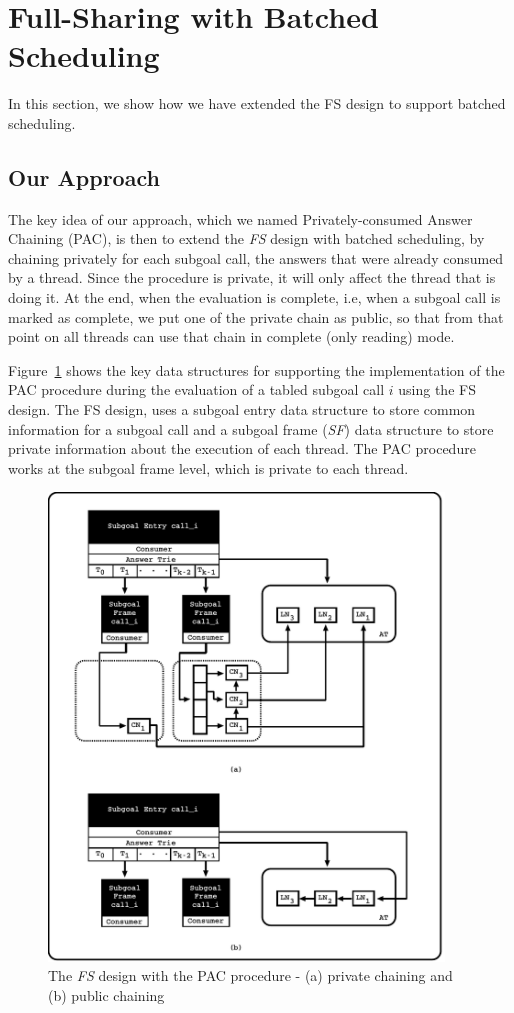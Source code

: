 \documentclass{llncs}
\begin{document}
\section{Full-Sharing with Batched Scheduling}

In this section, we show how we have extended the FS design to support
batched scheduling.

\subsection{Our Approach}

The key idea of our approach, which we named Privately-consumed Answer
Chaining (PAC), is then to extend the \emph{FS} design with batched
scheduling, by chaining privately for each subgoal call, the answers
that were already consumed by a thread. Since the procedure is
private, it will only affect the thread that is doing it. At the end,
when the evaluation is complete, i.e, when a subgoal call is marked as
complete, we put one of the private chain as public, so that from that
point on all threads can use that chain in complete (only reading)
mode.

Figure~\ref{fig_tabtries_pcc} shows the key data structures for
supporting the implementation of the PAC procedure during the
evaluation of a tabled subgoal call $i$ using the FS design. The FS
design, uses a subgoal entry data structure to store common
information for a subgoal call and a subgoal frame (\emph{SF}) data
structure to store private information about the execution of each
thread. The PAC procedure works at the subgoal frame level, which is
private to each thread.

\begin{figure}[!ht]
\centering
\includegraphics[width=10.5cm]{figures/pcc.pdf}
\caption{The \emph{FS} design with the PAC procedure - (a) private
  chaining and (b) public chaining}
\label{fig_tabtries_pcc}
\end{figure}
\end{document}
